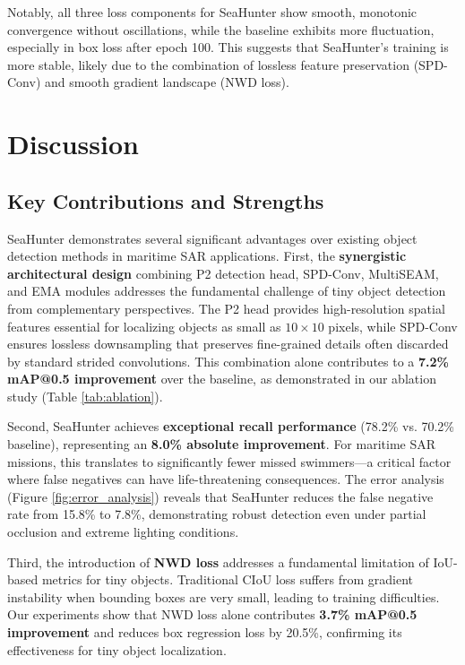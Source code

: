 \documentclass[lettersize,journal]{IEEEtran}
\begin{document}
Notably, all three loss components for SeaHunter show smooth, monotonic convergence without oscillations, while the baseline exhibits more fluctuation, especially in box loss after epoch 100. This suggests that SeaHunter's training is more stable, likely due to the combination of lossless feature preservation (SPD-Conv) and smooth gradient landscape (NWD loss).

\section{Discussion}
\label{sec:discussion}

\subsection{Key Contributions and Strengths}

SeaHunter demonstrates several significant advantages over existing object detection methods in maritime SAR applications. First, the \textbf{synergistic architectural design} combining P2 detection head, SPD-Conv, MultiSEAM, and EMA modules addresses the fundamental challenge of tiny object detection from complementary perspectives. The P2 head provides high-resolution spatial features essential for localizing objects as small as $10 \times 10$ pixels, while SPD-Conv ensures lossless downsampling that preserves fine-grained details often discarded by standard strided convolutions. This combination alone contributes to a \textbf{7.2\% mAP@0.5 improvement} over the baseline, as demonstrated in our ablation study (Table \ref{tab:ablation}).

Second, SeaHunter achieves \textbf{exceptional recall performance} (78.2\% vs. 70.2\% baseline), representing an \textbf{8.0\% absolute improvement}. For maritime SAR missions, this translates to significantly fewer missed swimmers—a critical factor where false negatives can have life-threatening consequences. The error analysis (Figure \ref{fig:error_analysis}) reveals that SeaHunter reduces the false negative rate from 15.8\% to 7.8\%, demonstrating robust detection even under partial occlusion and extreme lighting conditions.

Third, the introduction of \textbf{NWD loss} addresses a fundamental limitation of IoU-based metrics for tiny objects. Traditional CIoU loss suffers from gradient instability when bounding boxes are very small, leading to training difficulties. Our experiments show that NWD loss alone contributes \textbf{3.7\% mAP@0.5 improvement} and reduces box regression loss by 20.5\%, confirming its effectiveness for tiny object localization.
\end{document}
